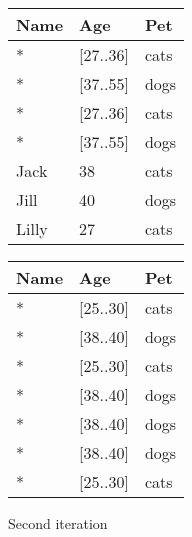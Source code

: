 \begin{figure}[H]
    \centering
    \begin{tabular}{l l l}
        \toprule
        \textbf{Name} & \textbf{Age} & \textbf{Pet} \\
        \midrule
        *	& [27..36]	& cats \\
        *	& [37..55]	& dogs \\
        *	& [27..36]	& cats \\
        *	& [37..55]	& dogs \\
        Jack  & 38 & cats \\
        Jill  & 40 & dogs \\
        Lilly & 27 & cats \\
        \bottomrule
    \end{tabular}
    \quad
    \begin{tabular}{l l l}
        \toprule
        \textbf{Name} & \textbf{Age} & \textbf{Pet} \\
        \midrule
        *	& [25..30]	& cats \\
        *	& [38..40]	& dogs \\
        *	& [25..30]	& cats \\
        *	& [38..40]	& dogs \\
        *	& [38..40]	& dogs \\
        *	& [38..40]	& dogs \\
        *	& [25..30]	& cats \\
        \bottomrule
    \end{tabular}
    \caption{Second iteration}\label{fig:continuous_step2}
\end{figure}